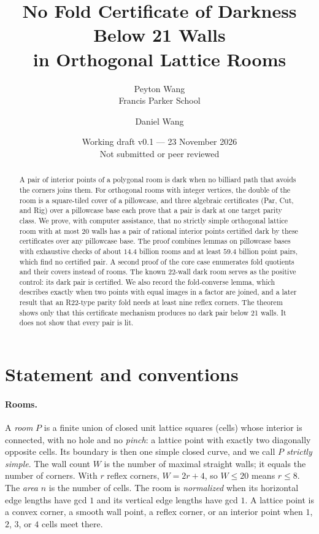 \documentclass[11pt]{article}
\title{No Fold Certificate of Darkness Below 21 Walls\\in Orthogonal Lattice Rooms}
\author{Peyton Wang\\\small Francis Parker School \and Daniel Wang}
\date{Working draft v0.1 --- 23 November 2026\\\small Not submitted or peer reviewed}
\theoremstyle{definition}
\theoremstyle{remark}
\begin{document}
\maketitle
\begin{abstract}
A pair of interior points of a polygonal room is dark when no billiard path
that avoids the corners joins them. For orthogonal rooms with integer
vertices, the double of the room is a square-tiled cover of a pillowcase, and
three algebraic certificates (Par, Cut, and Rig) over a pillowcase base each
prove that a pair is dark at one target parity class. We prove, with computer
assistance, that no strictly simple orthogonal lattice room with at most
20 walls has a pair of rational interior points certified dark by these
certificates over any pillowcase base. The proof combines lemmas on
pillowcase bases with exhaustive checks of about $14.4$ billion rooms and at
least $59.4$ billion point pairs, which find no certified pair. A second proof
of the core case enumerates fold quotients and their covers instead of rooms.
The known 22-wall dark room serves as the positive control: its dark pair is
certified. We also record the fold-converse lemma, which describes exactly
when two points with equal images in a factor are joined, and a later result
that an R22-type parity fold needs at least nine reflex corners. The theorem
shows only that this certificate mechanism produces no dark pair below
21 walls. It does not show that every pair is lit.
\end{abstract}

\section{Statement and conventions}\label{sec:statement}

\paragraph{Rooms.}
A \emph{room} $P$ is a finite union of closed unit lattice squares (cells)
whose interior is connected, with no hole and no \emph{pinch}: a lattice point
with exactly two diagonally opposite cells. Its boundary is then one simple
closed curve, and we call $P$ \emph{strictly simple}. The wall count $W$ is the
number of maximal straight walls; it equals the number of corners. With $r$
reflex corners, $W=2r+4$, so $W\le 20$ means $r\le 8$. The \emph{area} $n$ is
the number of cells. The room is \emph{normalized} when its horizontal edge
lengths have gcd $1$ and its vertical edge lengths have gcd $1$. A lattice
point is a convex corner, a smooth wall point, a reflex corner, or an interior
point when $1$, $2$, $3$, or $4$ cells meet there.
\end{document}
